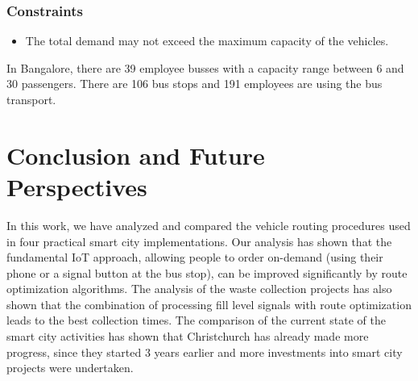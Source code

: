 \documentclass[10pt]{article}
\begin{document}
\subsubsection*{Constraints}

\begin{itemize}
\item The total demand may not exceed the maximum capacity of the vehicles. 
\end{itemize}

In Bangalore, there are 39 employee busses with a capacity range between 6 
and 30 passengers. There are 106 bus stops and 191 employees are using the bus transport.










\section{Conclusion and Future Perspectives}
\label{sec:concl}

In this work, we have analyzed and compared the vehicle routing procedures used in four practical 
smart city implementations. Our analysis has shown that the fundamental IoT approach, allowing
people to order on-demand (using their phone or a signal button at the bus stop), can be improved 
significantly by route optimization algorithms. The analysis of the waste collection projects has
also shown that the combination of processing fill level signals with route optimization leads
to the best collection times. The comparison of the current state of the smart city activities
has shown that Christchurch has already made more progress, since they started 3 years earlier
and more investments into smart city projects were undertaken.
\end{document}
